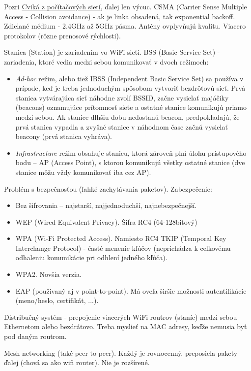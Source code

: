 \documentclass[10pt,a4paper]{article}
\begin{document}
Pozri \href{http://netlab.dcs.fmph.uniba.sk/siete/cviko2/}{Cviká z počítačových sietí}, ďalej len výcuc. 
CSMA (Carrier Sense Multiple Access - Collision avoidance) - ak je linka obsadená, tak exponential backoff. Zdielané médium - 2.4GHz až 5GHz pásma. 
Antény ovplyvňujú kvalitu. Viacero protokolov (rôzne prenosové rýchlosti).

Stanica (Station) je zariadením vo WiFi sieti. BSS (Basic Service Set) - zariadenia, ktoré vedia medzi sebou komunikovať v dvoch režimoch:
\begin{itemize}
\item \emph{Ad-hoc} režim, alebo tiež IBSS (Independent Basic Service Set) sa používa v prípade, keď je treba jednoduchým spôsobom vytvoriť bezdrôtovú sieť. Prvá stanica vytvárajúca sieť náhodne zvolí BSSID, začne vysielať majáčiky (beacons) oznamujúce prítomnosť siete a ostatné stanice komunikujú priamo medzi sebou. Ak stanice dlhšiu dobu nedostanú beacon, predpokladajú, že prvá stanica vypadla a zvyšné stanice v náhodnom čase začnú vysielať beacony (prvá stanica vyhráva).
\item \emph{Infrastructure} režim obsahuje stanicu, ktorá zároveň plní úlohu prístupového bodu -- AP (Access Point), s ktorou komunikujú všetky ostatné stanice (dve stanice môžu vždy komunikovať iba cez AP).
\end{itemize}
     
Problém s bezpečnosťou (ľahké zachytávania paketov). Zabezpečenie: 
\begin{itemize}                                                 
\item Bez šifrovania -- najstarší, najjednoduchší, najnebezpečnejší.
\item WEP (Wired Equivalent Privacy). Šifra RC4 (64-128bitový)        
\item WPA (Wi-Fi Protected Access). Namiesto RC4 TKIP (Temporal Key Interchange Protocol) - časté menenie kľúčov (neprichádza k celkovému odhaleniu komunikácie pri odhlení jedného kľúča).
\item WPA2. Novšia verzia. 
\item EAP (použivaný aj v point-to-point). Má oveľa širšie možnosti autentifikácie (meno/heslo, certifikát, ...).
\end{itemize}
      
Distribučný systém - prepojenie viacerých WiFi routrov (staníc) medzi sebou Ethernetom alebo bezdrátovo. Treba myslieť na MAC adresy, keďže nemusia byť pod daným routrom. 

Mesh networking (také peer-to-peer). Každý je rovnocenný, preposiela pakety ďalej (chová sa ako wifi router). Nie je rozšírené. 
      
\end{document}
